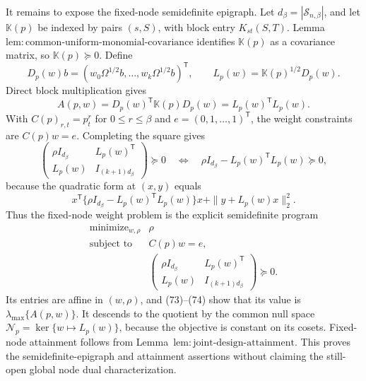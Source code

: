 It remains to expose the fixed-node semidefinite epigraph.  Let \(d_\beta=|\mathcal S_{n,\beta}|\), and let \(\mathbb K(p)\) be indexed by pairs \((s,S)\), with block entry \(K_{st}(S,T)\).  Lemma~\(\mathrm{lem{:}common\text{-}uniform\text{-}monomial\text{-}covariance}\) identifies \(\mathbb K(p)\) as a covariance matrix, so \(\mathbb K(p)\succeq0\).  Define
\[
D_p(w)b=(w_0\Omega^{1/2}b,\ldots,w_k\Omega^{1/2}b)^{\mathsf T},
\qquad
L_p(w)=\mathbb K(p)^{1/2}D_p(w).
\]
Direct block multiplication gives
\[
A(p,w)=D_p(w)^{\mathsf T}\mathbb K(p)D_p(w)
=L_p(w)^{\mathsf T}L_p(w).
\tag{73}
\]
With \(C(p)_{r,t}=p_t^r\) for \(0\le r\le\beta\) and \(e=(0,1,\ldots,1)^{\mathsf T}\), the weight constraints are \(C(p)w=e\).  Completing the square gives
\[
\begin{pmatrix}
\rho I_{d_\beta}&L_p(w)^{\mathsf T}\\
L_p(w)&I_{(k+1)d_\beta}
\end{pmatrix}\succeq0
\quad\Longleftrightarrow\quad
\rho I_{d_\beta}-L_p(w)^{\mathsf T}L_p(w)\succeq0,
\tag{74}
\]
because the quadratic form at \((x,y)\) equals
\[
x^{\mathsf T}\{\rho I_{d_\beta}-L_p(w)^{\mathsf T}L_p(w)\}x
+\|y+L_p(w)x\|_2^2.
\]
Thus the fixed-node weight problem is the explicit semidefinite program
\[
\begin{array}{ll}
\text{minimize}_{w,\rho}&\rho\\
\text{subject to}&C(p)w=e,\\
&\begin{pmatrix}
\rho I_{d_\beta}&L_p(w)^{\mathsf T}\\
L_p(w)&I_{(k+1)d_\beta}
\end{pmatrix}\succeq0.
\end{array}
\tag{75}
\]
Its entries are affine in \((w,\rho)\), and (73)--(74) show that its value is \(\lambda_{\max}\{A(p,w)\}\).  It descends to the quotient by the common null space \(\mathcal N_p=\ker\{w\mapsto L_p(w)\}\), because the objective is constant on its cosets.  Fixed-node attainment follows from Lemma~\(\mathrm{lem{:}joint\text{-}design\text{-}attainment}\).  This proves the semidefinite-epigraph and attainment assertions without claiming the still-open global node dual characterization.